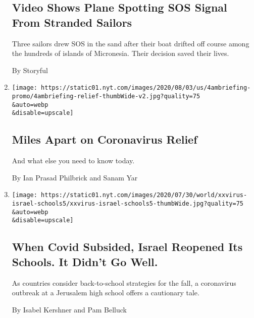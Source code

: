 \begin{enumerate}
  \hypertarget{video-shows-plane-spotting-sos-signal-from-stranded-sailors}{%
  \subsection{Video Shows Plane Spotting SOS Signal From Stranded
  Sailors}\label{video-shows-plane-spotting-sos-signal-from-stranded-sailors}}

  Three sailors drew SOS in the sand after their boat drifted off course
  among the hundreds of islands of Micronesia. Their decision saved
  their lives.

  By Storyful
\item
  \href{/2020/08/04/briefing/coronavirus-relief-primary-elections-isaias-your-tuesday-briefing.html}{}

  \texttt{[image: https://static01.nyt.com/images/2020/08/03/us/4ambriefing-promo/4ambriefing-relief-thumbWide-v2.jpg?quality=75\\\&auto=webp\\\&disable=upscale]}

  \hypertarget{miles-apart-on-coronavirus-relief}{%
  \subsection{Miles Apart on Coronavirus
  Relief}\label{miles-apart-on-coronavirus-relief}}

  And what else you need to know today.

  By Ian Prasad Philbrick and Sanam Yar
\item
  \href{/2020/08/04/world/middleeast/coronavirus-israel-schools-reopen.html}{}

  \texttt{[image: https://static01.nyt.com/images/2020/07/30/world/xxvirus-israel-schools5/xxvirus-israel-schools5-thumbWide.jpg?quality=75\\\&auto=webp\\\&disable=upscale]}

  \hypertarget{when-covid-subsided-israel-reopened-its-schools-it-didnt-go-well}{%
  \subsection{When Covid Subsided, Israel Reopened Its Schools. It
  Didn't Go
  Well.}\label{when-covid-subsided-israel-reopened-its-schools-it-didnt-go-well}}

  As countries consider back-to-school strategies for the fall, a
  coronavirus outbreak at a Jerusalem high school offers a cautionary
  tale.

  By Isabel Kershner and Pam Belluck
\end{enumerate}

